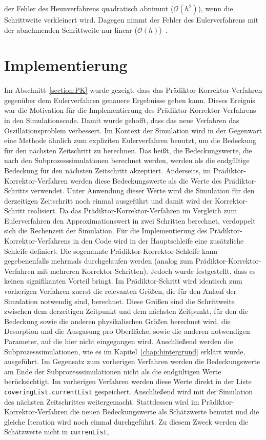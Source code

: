 \documentclass{listhesis}
\begin{document}
der Fehler des Heunverfahrens quadratisch abnimmt ($\mathcal{O}(h^2)$), wenn die Schrittweite verkleinert wird. Dagegen nimmt der Fehler des Eulerverfahrens mit der abnehmenden Schrittweite nur linear ($\mathcal{O}(h)$)~\cite{ulbrich}.

\section{Implementierung} \label{section:implement}
\paragraph{}
Im Abschnitt~\ref{section:PK} wurde gezeigt, dass das Prädiktor-Korrektor-Verfahren gegen\-über dem Eulerverfahren genauere Ergebnisse geben kann. Dieses Ereignis war die Motivation für die Implementierung des Prädiktor-Korrektor-Verfahrens in den Simulationscode. Damit wurde gehofft, dass das neue Verfahren das Oszillationsproblem verbessert. Im Kontext der Simulation wird in der Gegenwart eine Methode ähnlich zum expliziten Eulerverfahren benutzt, um die Bedeckung für den nächsten Zeitschritt zu berechnen. Das heißt, die Bedeckungswerte, die nach den Subprozesssimulationen berechnet werden, werden als die endgültige Bedeckung für den nächsten Zeitschritt akzeptiert. Anderseits, im Prädiktor-Korrektor-Verfahren werden diese Bedeckungswerte als die Werte des Prädiktor-Schritts verwendet. Unter Anwendung dieser Werte wird die Simulation für den derzeitigen Zeitschritt noch einmal ausgeführt und damit wird der Korrektor-Schritt realisiert. Da das Prädiktor-Korrektor-Verfahren im Vergleich zum Eulerverfahren den Approximationswert in zwei Schritten berechnet, verdoppelt sich die Rechenzeit der Simulation. Für die Implementierung des Prädiktor-Korrektor-Verfahrens in den Code wird in der Hauptschleife eine zusätzliche Schleife definiert. Die sogenannte Prädiktor-Korrektor-Schleife kann gegebenenfalls mehrmals durchgelaufen werden (analog zum Prädiktor-Korrektor-Verfahren mit mehreren Korrektor-Schritten). Jedoch wurde festgestellt, dass es keinen signifikanten Vorteil bringt. Im Prädiktor-Schritt wird identisch zum vorherigen Verfahren zuerst die relevanten Größen, die für den Anlauf der Simulation notwendig sind, berechnet. Diese Größen sind die Schrittweite zwischen dem derzeitigen Zeitpunkt und dem nächsten Zeitpunkt, für den die Bedeckung sowie die anderen physikalischen Größen berechnet wird, die Desorption und die Ausgasung pro Oberfläche, sowie die anderen notwendigen Parameter, auf die hier nicht eingegangen wird. Anschließend werden die Subprozesssimulationen, wie es im Kapitel~\ref{chap:hintergrund} erklärt wurde, ausgeführt. Im Gegensatz zum vorherigen Verfahren werden die Bedeckungswerte am Ende der Subprozesssimulationen nicht als die endgültigen Werte berücksichtigt. Im vorherigen Verfahren werden diese Werte direkt in der Liste \texttt{coveringList.currentList} gespeichert. Anschließend wird mit der Simulation des nächsten Zeitschrittes weitergemacht. Stattdessen wird im Prädiktor-Korrektor-Verfahren die neuen Bedeckungswerte als Schätzwerte benutzt und die gleiche Iteration wird noch einmal durchgeführt. Zu diesem Zweck werden die Schätzwerte nicht in \texttt{currenList}, 
\end{document}
